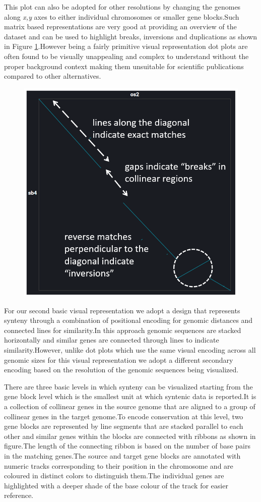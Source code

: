 This plot can also be adopted for other resolutions by changing the genomes along \textit{x,y} axes to either individual chromosomes or smaller gene blocks.Such matrix based representations are very good at providing an overview of the dataset and can be used to highlight breaks, inversions and duplications as shown in Figure \ref{fig:ch_4_dot_plot_b}.However being a fairly primitive visual representation dot plots are often found to be visually unappealing and complex to understand without the proper background context making them unsuitable for scientific publications compared to other alternatives.


\begin{figure}
  \centering
  \includegraphics[width=.475\linewidth]{images/ch_4_dot_plot_b.PNG}
  \label{fig:ch_4_dot_plot_b}
\end{figure}


For our second basic visual representation we adopt a design that represents synteny through a combination of positional encoding for genomic distances and connected lines for similarity.In this approach genomic sequences are stacked horizontally and similar genes are connected through lines to indicate similarity.However, unlike dot plots which use the same visual encoding across all genomic sizes for this visual representation we adopt a different secondary encoding based on the resolution of the genomic sequences being visualized. 


There are three basic levels in which synteny can be visualized starting from the gene block level which is the smallest unit at which syntenic data is reported.It is a collection of collinear genes in the source genome that are aligned to a group of collinear genes in the target genome.To encode conservation at this level, two gene blocks are represented by line segments that are stacked parallel to each other and similar genes within the blocks are connected with ribbons as shown in figure.The length of the connecting ribbon is based on the number of base pairs in the matching genes.The source and target gene blocks are annotated with numeric tracks corresponding to their position in the chromosome and are coloured in distinct colors to distinguish them.The individual genes are highlighted with a deeper shade of the base colour of the track for easier reference. 

